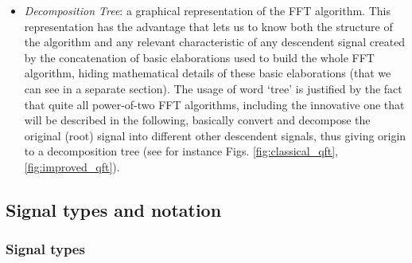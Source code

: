 \documentclass[a4paper,10pt]{article}
\begin{document}
\begin{itemize}
\item
\emph{Decomposition Tree}: a graphical representation of the FFT algorithm.
This representation has the advantage that lets us to know both the structure of the algorithm and any relevant characteristic of any descendent signal created by the concatenation of basic elaborations used to build the whole FFT algorithm, hiding mathematical details of these basic elaborations (that we can see in a separate section). 
The usage of word `tree' is justified by the fact that quite all power-of-two FFT algorithms, including the innovative one that will be described in the following, basically convert and decompose the original (root) signal into different other descendent signals, thus giving origin to a decomposition tree (see for instance  Figs. \ref{fig:classical_qft},\ref{fig:improved_qft}).



\end{itemize}










\subsection{Signal types and notation} \label{sec:notation}

\subsubsection{Signal types}
\end{document}
